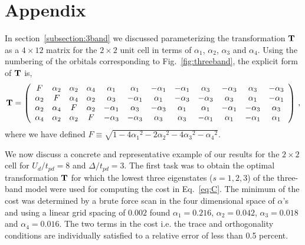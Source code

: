 \section*{Appendix}
In section~\ref{subsection:3band} we discussed parameterizing the transformation ${\bf T}$ 
as a $4\times12$ matrix for the $2 \times 2$ unit cell in terms of $\alpha_1$, $\alpha_2$, $\alpha_3$ 
and $\alpha_4$. Using the numbering of the orbitals corresponding to Fig.~\ref{fig:threeband}, 
the explicit form of ${\bf T}$ is,
\begin{eqnarray}
{\bf T} = 
\left(
\begin{array}{cccccccccccc}
F        & \alpha_2 &        \alpha_2 &  \alpha_4 & \alpha_1 & \alpha_1 & -\alpha_1 & -\alpha_1 & \alpha_3 & -\alpha_3 & \alpha_3 & -\alpha_3 \\
\alpha_2 &  F       &        \alpha_4 &  \alpha_2 & \alpha_3 & -\alpha_1 & \alpha_1 & -\alpha_3 & -\alpha_3 & \alpha_3 & \alpha_1 & -\alpha_1 \\
\alpha_2 & \alpha_4 & F               &  \alpha_2 & -\alpha_1 & \alpha_3 & -\alpha_3 & \alpha_1 & \alpha_1 & -\alpha_1 & -\alpha_3 & \alpha_3 \\
\alpha_4 & \alpha_2 & \alpha_2        &   F       & -\alpha_3 & -\alpha_3 & \alpha_3 & \alpha_3 & -\alpha_1 & \alpha_1 & -\alpha_1 & \alpha_1 \\
\end{array}
\right)\,,
\end{eqnarray}
where we have defined $F \equiv \sqrt{1-4{\alpha_1}^2 - 2{\alpha_2}^2 - 4 {\alpha_3}^2 -{\alpha_4}^2}$.

We now discuss a concrete and representative example of our results for the $2\times2$ cell 
for $U_d/t_{pd}=8$ and $\Delta/t_{pd}=3$. The first task was to obtain the optimal transformation ${\bf T}$ 
for which the lowest three eigenstates ($s=1,2,3$) of the three-band model were used for 
computing the cost in Eq.~\eqref{eq:C}. The minimum of the cost was 
determined by a brute force scan in the four dimensional space of $\alpha$'s and 
using a linear grid spacing of $0.002$ found $\alpha_1=0.216$, $\alpha_2=0.042$, $\alpha_3=0.018$ and $\alpha_4=0.016$. 
The two terms in the cost i.e. the trace and orthogonality conditions are individually satisfied to a relative error of 
less than 0.5 percent. 

